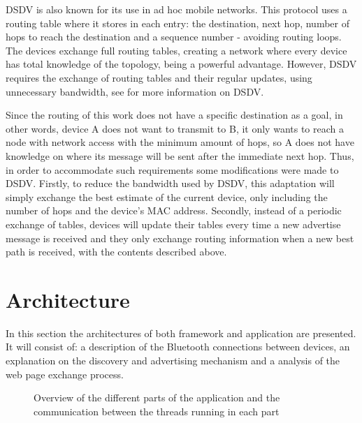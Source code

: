 \gls{DSDV} is also known for its use in ad hoc mobile networks. This protocol uses a routing table where it stores in each entry: the destination, next hop, number of hops to reach the destination and a sequence number - avoiding routing loops. The devices exchange full routing tables, creating a network where every device has total knowledge of the topology, being a powerful advantage. However, \gls{DSDV} requires the exchange of routing tables and their regular updates, using unnecessary bandwidth, see \cite{dsdv} for more information on \gls{DSDV}.

Since the routing of this work does not have a specific destination as a goal, in other words, device A does not want to transmit to B, it only wants to reach a node with network access with the minimum amount of hops, so A does not have knowledge on where its message will be sent after the immediate next hop. Thus, in order to accommodate such requirements some modifications were made to \gls{DSDV}. Firstly, to reduce the bandwidth used by \gls{DSDV}, this adaptation will simply exchange the best estimate of the current device, only including the number of hops and the device's \gls{MAC} address. Secondly, instead of a periodic exchange of tables, devices will update their tables every time a new advertise message is received and they only exchange routing information when a new best path is received, with the contents described above.

\section{Architecture}
\label{sec:architecture}

In this section the architectures of both framework and application are presented. It will consist of: a description of the Bluetooth connections between devices, an explanation on the discovery and advertising mechanism and a analysis of the web page exchange process.

\begin{figure}[ht]
	\noindent{}
	\caption{\label{fig:appsandbox} Overview of the different parts of the application and the communication between the threads running in each part}
\end{figure}

